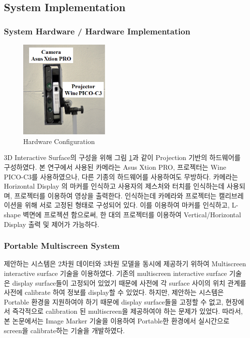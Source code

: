 \subsection{System Implementation}
\subsubsection{System Hardware / Hardware Implementation}
\begin{figure}[ht!]
	\centering
    \includegraphics[width=0.4\textwidth]{3-System/hardware}
	\caption{Hardware Configuration}
    \label{fig:hardware}
\end{figure}
3D Interactive Surface의 구성을 위해 그림 \ref{fig:hardware}과 같이 Projection 기반의 하드웨어를 구성하였다. 본 연구에서 사용된 카메라는 Asus Xtion PRO, 프로젝터는 Wine PICO-C3를 사용하였으나, 다른 기종의 하드웨어를 사용하여도 무방하다. 카메라는 Horizontal Display 의 마커를 인식하고 사용자의 제스처와 터치를 인식하는데 사용되며, 프로젝터를 이용하여 영상을 출력한다. 인식하는데 카메라와 프로젝터는 캘리브레이션을 위해 서로 고정된 형태로 구성되어 있다. 이를 이용하여 마커를 인식하고, L-shape 벽면에 프로젝션 함으로써, 한 대의 프로젝터를 이용하여 Vertical/Horizontal Display 출력 및 제어가 가능하다.

\subsubsection{Portable Multiscreen System}

제안하는 시스템은 2차원 데이터와 3차원 모델을 동시에 제공하기 위하여 Multiscreen interactive surface 기술을 이용하였다. 기존의 multiscreen interactive surface 기술은 display surface들이 고정되어 있었기 때문에 사전에 각 surface 사이의 위치 관계를 사전에 calibrate 하여 정보를 display할 수 있었다. 하지만, 제안하는 시스템은 Portable 환경을 지원하여야 하기 때문에 display surface들을 고정할 수 없고, 현장에서 즉각적으로 calibration 된 multiscreen을 제공하여야 하는 문제가 있었다. 따라서, 본 논문에서는 Image Marker 기술을 이용하여 Portable한 환경에서 실시간으로 screen을 calibrate하는 기술을 개발하였다.

